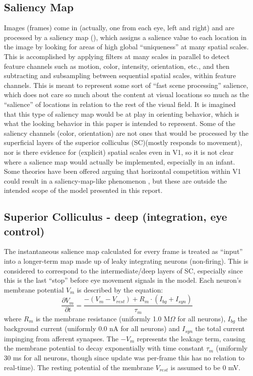 \documentclass[conference]{IEEEtran}
\begin{document}
\subsection{Saliency Map}
Images (frames) come in (actually, one from each eye, left and right)
and are processed by a saliency map (\cite{itti_etal_1998}), which
assigns a salience value to each location in the image by looking for
areas of high global ``uniqueness'' at many spatial scales. This is
accomplished by applying filters at many scales in parallel to detect
feature channels such as motion, color, intensity, orientation, etc.,
and then subtracting and subsampling between sequential spatial
scales, within feature channels. This is meant to represent some sort
of ``fast scene processing'' salience, which does not care so much
about the content at visual locations so much as the ``salience'' of
locations in relation to the rest of the visual field. It is imagined
that this type of saliency map would be at play in orienting behavior,
which is what the looking behavior in this paper is intended to
represent. Some of the saliency channels (color, orientation) are not
ones that would be processed by the superficial layers of the superior
colliculus (SC)(mostly responds to movement), nor is there evidence
for (explicit) spatial scales even in V1, so it is not clear where a
salience map would actually be implemented, especially in an
infant. Some theories have been offered arguing that horizontal
competition within V1 could result in a saliency-map-like phenomenon
\cite{li_2002_v1saliency}, but these are outside the intended scope of
the model presented in this report.

\subsection{Superior Colliculus - deep (integration, eye control)}
The instantaneous salience map calculated for every frame is treated
as ``input'' into a longer-term map made up of leaky integrating
neurons (non-firing). This is considered to correspond to the
intermediate/deep layers of SC, especially since this is the last
``stop'' before eye movement signals in the model. Each neuron's
membrane potential $V_m$ is described by the equation:
\begin{equation}
\frac{\partial V_m}{\partial t} = \frac{-(V_m - V_{rest}) + R_m \cdot
  (I_{bg} + I_{syn})}{\tau_m}
\end{equation}
where $R_m$ is the membrane resistance (uniformly 1.0 M$\Omega$ for
all neurons), $I_{bg}$ the background current (uniformly 0.0 nA for
all neurons) and $I_{syn}$ the total current impinging from afferent
synapses. The $-V_m$ represents the leakage term, causing the membrane
potential to decay exponentially with time constant $\tau_m$
(uniformly 30 ms for all neurons, though since update was per-frame
this has no relation to real-time). The resting potential of the
membrane $V_{rest}$ is assumed to be 0 mV.
\end{document}
